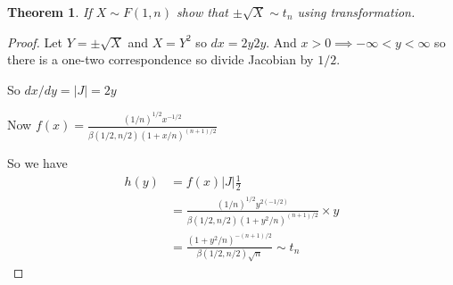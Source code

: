 \documentclass[oneside,11pt,pdftex]{book}%
\numberwithin{equation}{section}
\newtheorem{theorem}{Theorem}[chapter]%
\numberwithin{section}{chapter}
\numberwithin{equation}{chapter}
\begin{document}
\begin{theorem}
	If $ X \sim F(1,n) $ show that $ \pm \sqrt{X} \sim t_n$ using transformation.
\end{theorem}
\begin{proof}
	Let $ Y=\pm \sqrt{X} $ and $ X=Y^2 $ so $ dx=2y 2y $. And  $  x>0 \implies -\infty <y<\infty $ so there is a one-two correspondence so divide Jacobian by $ 1/2 $.
	
	So $ dx/dy=|J|=2y $
	
	Now $ f(x)=\frac{(1/n)^{1/2}x^{-1/2}}{\beta(1/2,n/2)(1+x/n)^{(n+1)/2}} $
	
	So we have 
	\begin{align*}
		h(y)&=f(x)|J|\frac{1}{2}\\
		&=\frac{(1/n)^{1/2}y^{2(-1/2)}}{\beta(1/2,n/2)(1+y^2/n)^{(n+1)/2}}\times y\\
		&=\frac{(1+y^2/n)^{-(n+1)/2}}{\beta(1/2,n/2)\sqrt{n}}\sim t_n
	\end{align*}
\end{proof}
\end{document}
